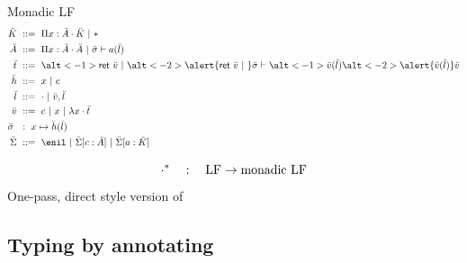 \documentclass[ignorenonframetext,red]{beamer}
\begin{document}
\begin{frame}{Monadic LF}
  \inXLF
  \begin{align*}
    \mk &\gequal \prd\mv\mf\mk \gor \type \\
    \mf &\gequal \prd\mv\mf\mf \gor \sapply\ms{\lapp\mcf\ma} \\
    \mo &\gequal \alt<-1>{\ret\mval\gor}{\alt<-2>{\alert{\ret\mval
          \gor}}{}} \sapply\ms{\alt<-1>{\lapp\mval\ma}{\alt<-2>{\alert{\lapp\mval\ma}}{\mval}}} \\
    \mh &\gequal \mv \gor \mco \\
    \ma &\gequal \lnil \gor \lcons\mval\ma \\
    \mval &\gequal \mco \gor \mv \gor \ulam\mv\mo \\
    \ms\ &\ :\ \mv\mapsto{\lapp\mh\ma} \\
    \msi &\gequal { \enil \gor \ebinddecl\msi\mco\mf \gor
      \ebinddecl\msi\mcf\mk }
  \end{align*}
  \pause\pause\pause
 \begin{definition}
    $$ {\cdot}^* \quad:\quad \text{LF} \to \text{monadic LF} $$
    One-pass, direct style version of 
 \end{definition}
\end{frame}

\subsection{Typing by annotating}
\end{document}
